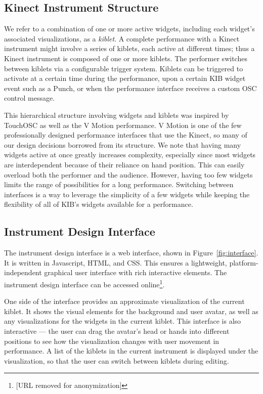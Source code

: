 \documentclass{nime-alternate}
\begin{document}
\subsection{Kinect Instrument Structure}
We refer to a combination of one or more active widgets, including each widget's associated visualizations, as a 
\textit{kiblet}. A complete performance with a Kinect instrument might involve a series 
of kiblets, each active at different times; thus a Kinect instrument is composed of one or more kiblets. 
The performer switches between kiblets via a
configurable trigger system. Kiblets can be triggered to activate at a certain time during the
performance, upon a certain KIB widget event such as a Punch, or when the performance interface
receives a custom OSC control message. 

This hierarchical structure involving widgets and kiblets was inspired by TouchOSC as well as the V Motion 
performance. V Motion is one of the few professionally designed performance interfaces that use the Kinect,
so many of our design decisions borrowed from its structure. We note that having many
widgets active at once greatly increases complexity, especially since most widgets 
are interdependent because of their reliance on hand position.
This can easily overload both the performer and the audience.
However, having too few widgets limits the range of possibilities for a long
performance. Switching between interfaces is a way to leverage the simplicity of
a few widgets while keeping the flexibility of all of KIB's widgets available for a performance. 

\subsection{Instrument Design Interface}
The instrument design interface is a web interface, shown in Figure~\ref{fig:interface}. It is written in Javascript,
HTML, and CSS. This ensures a lightweight, platform-independent graphical user interface
with rich interactive elements. The instrument design interface can be accessed online\footnote{[URL removed for anonymization]}.

One side of the interface provides an approximate visualization of the current kiblet. It shows the visual
elements for the background and user avatar, as well as any visualizations for the widgets
in the current kiblet. This interface is also interactive --- the user can drag the avatar's head or hands
into different positions to see how the visualization changes with user movement in performance.
A list of the kiblets in the current instrument is displayed under the visualization, so
that the user can switch between kiblets during editing.
\end{document}
